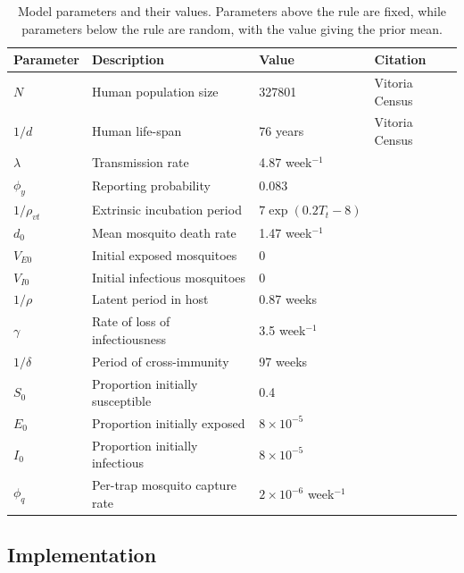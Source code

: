 \documentclass[10pt,letterpaper]{article}
\begin{document}
\begin{table}[!ht]
\label{parameters}
\begin{adjustwidth}{-2.25in}{0in} 
\begin{center}
\caption{Model parameters and their values.  Parameters above the rule are fixed, while parameters below the rule are random, with the value giving the prior mean.}
\begin{tabular}{llll}
Parameter & Description & Value & Citation\\
\hline
$N$ & Human population size & 327801 & Vitoria Census\\
$1/d$ & Human life-span & 76 years & Vitoria Census\\
$\lambda$ & Transmission rate & 4.87 week$^{-1}$ & \cite{Scott2000}\\
$\phi_y$ & Reporting probability & 0.083 & \cite{Silva2016}\\
$1/\rho_{vt}$ & Extrinsic incubation period & $7\exp \left( 0.2 T_t - 8 \right)$ & \cite{Chan2012}\\
$d_0$ & Mean mosquito death rate & 1.47 week$^{-1}$ & \cite{Brady2013} \\
$V_{E0}$ & Initial exposed mosquitoes &  0 & \\
$V_{I0}$ & Initial infectious mosquitoes & 0 & \\
\hline
$1/\rho$ & Latent period in host & 0.87 weeks  & \cite{Chan2012}\\
$\gamma$ & Rate of loss of infectiousness & 3.5 week$^{-1}$ & \cite{Nguyet2013}\\
$1/\delta$ & Period of cross-immunity & 97 weeks &  \cite{Reich2013}\\
$S_0$ & Proportion initially susceptible & 0.4 & \cite{Cardoso2011a} \\
$E_0$ & Proportion initially exposed & $8\times 10 ^ {-5}$ & \\
$I_0$ & Proportion initially infectious & $8\times 10 ^ {-5}$ & \\
$\phi_q$ & Per-trap mosquito capture rate & $2 \times 10^{-6}$ week$^{-1}$ & 
\end{tabular}
\end{center}
\end{adjustwidth}
\end{table}

\subsection*{Implementation}
\end{document}
